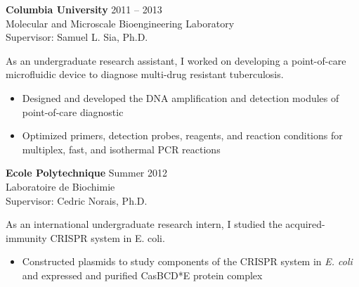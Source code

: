 \documentclass[10pt]{article}
\newenvironment{innerlist}[1][\enskip\textbullet]%
        {\begin{itemize}[#1,leftmargin=*,parsep=0pt,itemsep=0pt,topsep=0pt,partopsep=0pt]}
        {\end{itemize}}
\begin{document}
\vspace{.15in}
\textbf{Columbia University} \hfill {2011 -- 2013} \\
Molecular and Microscale Bioengineering Laboratory \\
Supervisor: Samuel L. Sia, Ph.D. 
	\vspace{0.1in}

As an undergraduate research assistant, I worked on developing a point-of-care microfluidic device to diagnose multi-drug resistant tuberculosis. \\

\begin{innerlist}
\item{Designed and developed the DNA amplification and detection modules of point-of-care diagnostic}
\item{Optimized primers, detection probes, reagents, and reaction conditions for multiplex, fast, and isothermal PCR reactions}
\end{innerlist}

\vspace{.15in}
\textbf{Ecole Polytechnique} \hfill {Summer 2012}\\
Laboratoire de Biochimie\\
Supervisor: Cedric Norais, Ph.D.
	\vspace{0.1in}

As an international undergraduate research intern, I studied the acquired-immunity CRISPR system in E. coli. \\

\begin{innerlist}
\item{Constructed plasmids to study components of the CRISPR system in \textit{E. coli} and expressed and purified CasBCD*E protein complex}
\end{innerlist}
\end{document}
